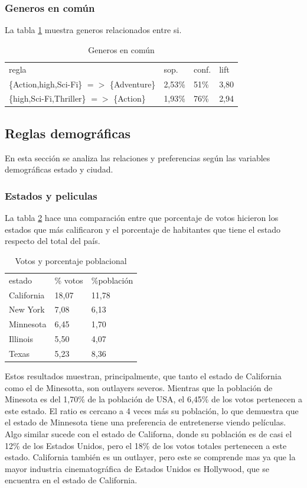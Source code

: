 \documentclass[journal]{IEEEtran}
\begin{document}
\subsubsection{Generos en común}
La tabla \ref{table_common_genre} muestra generos relacionados 
entre si. 
\begin{table}[ht!]
\caption{Generos en común}
\label{table_common_genre}
\centering
\begin{tabular}{l l l l }
regla & sop. & conf. & lift \\
\{Action,high,Sci-Fi\} $=$$>$ \{Adventure\} & 2,53\% & 51\% & 3,80 \\
\{high,Sci-Fi,Thriller\} $=$$>$ \{Action\} & 1,93\% & 76\% & 2,94 
\end{tabular}
\end{table}





\subsection{Reglas demográficas}
En esta sección se analiza las relaciones y preferencias según las variables 
demográficas estado y ciudad. 

\subsubsection{Estados y peliculas}
La tabla \ref{table_state_population} hace una comparación entre que porcentaje
de votos hicieron los estados que más calificaron y el porcentaje de habitantes
que tiene el estado respecto del total del país.

\begin{table}[ht!]
\caption{Votos y porcentaje poblacional}
\label{table_state_population}
\centering
\begin{tabular}{l l l}
estado & \% votos & \%población  \\
California & 18,07 & 11,78 \\
New York & 7,08 & 6,13 \\
Minnesota & 6,45 & 1,70 \\
Illinois & 5,50 & 4,07 \\
Texas & 5,23 & 8,36
\end{tabular}
\end{table}

Estos resultados muestran, principalmente, que tanto el estado de California
como el de Minesotta, son outlayers severos. Mientras que la población de
Minesota es del 1,70\% de la población de USA, el 6,45\% de los votos pertenecen
a este estado. El ratio es cercano a 4 veces más su población, lo que demuestra
que el estado de Minnesota tiene una preferencia de entretenerse viendo películas.
Algo similar sucede con el estado de Californa, donde su población es de casi el
12\% de los Estados Unidos, pero el 18\% de los votos totales pertenecen a este
estado. California también es un outlayer, pero este se comprende mas ya que la
mayor industria cinematográfica de Estados Unidos es Hollywood, que se encuentra
en el estado de California.
\end{document}
